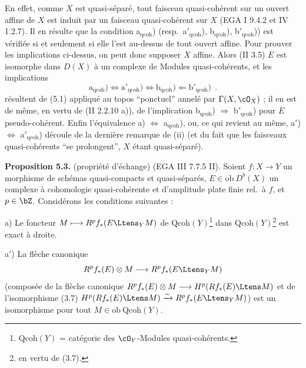 En effet, comme $X$ est quasi-s\'{e}par\'{e}, tout faisceau quasi-coh\'{e}rent sur un ouvert affine de $X$ est induit par un faisceau quasi-coh\'{e}rent sur $X$ (EGA I 9.4.2 et IV 1.2.7). Il en r\'{e}sulte que la condition a$_{\mathrm{qcoh}}$) (resp.\ a$'_{\mathrm{qcoh}}$), b$_{\mathrm{qcoh}}$), b$'_{\mathrm{qcoh}}$)) est v\'{e}rifi\'{e}e si et seulement si elle l'est au-dessus de tout ouvert affine. Pour prouver les implications ci-dessus, on peut donc supposer $X$ affine. Alors (II 3.5) $E$ est isomorphe dans $D(X)$ \`{a} un complexe de Modules quasi-coh\'{e}rents, et les implications
\[
\mathrm{a_{\mathrm{qcoh}}}) \Longleftrightarrow \mathrm{a'_{\mathrm{qcoh}}}) \Longleftrightarrow \mathrm{b_{\mathrm{qcoh}}}) \Longleftarrow \mathrm{b'_{\mathrm{qcoh}}})\ \ .
\]
r\'{e}sultent de (5.1) appliqu\'{e} au topos ``ponctuel'' annel\'{e} par $\Gamma(X, \cO_X)$ ; il en est de m\^{e}me, en vertu de (II 2.2.10 a)), de l'implication b$_{\mathrm{qcoh}}$) $\Longrightarrow$ b$'_{\mathrm{qcoh}}$) pour $E$ pseudo-coh\'{e}rent. Enfin l'\'{e}quivalence a) $\Longleftrightarrow$ a$_{\mathrm{qcoh}}$), ou, ce qui revient au m\^{e}me, a$'$) $\Longleftrightarrow$ a$'_{\mathrm{qcoh}}$) d\'{e}coule de la derni\`{e}re remarque de (ii) (et du fait que les faisceaux quasi-coh\'{e}rents ``se prolongent'', $X$ \'{e}tant quasi-s\'{e}par\'{e}).

\medskip

\noindent\textbf{Proposition 5.3.} (propri\'{e}t\'{e} d'\'{e}change) (EGA III 7.7.5 II). Soient $f : X \longrightarrow Y$ un morphisme de sch\'{e}mas quasi-compacts et quasi-s\'{e}par\'{e}s, $E \in \mathrm{ob}\ D^b(X)$ un complexe \`{a} cohomologie quasi-coh\'{e}rente et d'amplitude plate finie rel.\ \`{a} $f$, et $p \in \bZ$. Consid\'{e}rons les conditions suivantes :

\medskip

\noindent a) Le foncteur $M \longmapsto R^pf_*(E \Ltens_Y M)$ de $\mathrm{Qcoh}(Y)$\footnote{$\mathrm{Qcoh}(Y)$ = cat\'{e}gorie des $\cO_Y$-Modules quasi-coh\'{e}rents.} dans $\mathrm{Qcoh}(Y)$\footnote{en vertu de (3.7).} est exact \`{a} droite.

\smallskip

\noindent a$'$) La fl\`{e}che canonique
\[
R^pf_*(E) \otimes M \longrightarrow R^pf_*(E \Ltens_Y M)
\]
(compos\'{e}e de la fl\`{e}che canonique $R^pf_*(E) \otimes M \longrightarrow H^p(Rf_*(E) \Ltens M)$ et de l'isomorphisme (3.7) $H^p(Rf_*(E) \Ltens M) \xrightarrow{\sim} R^pf_*(E \Ltens_Y M)$) est un isomorphisme pour tout $M \in \mathrm{ob}\ \mathrm{Qcoh}(Y)$.

